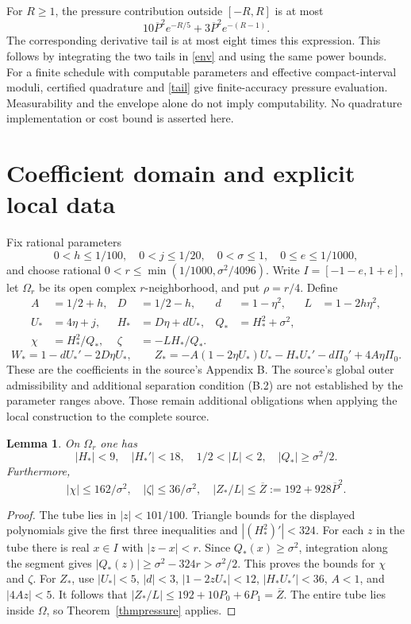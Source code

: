 \documentclass[11pt]{article}
\newtheorem{lemma}[theorem]{Lemma}
\begin{document}
For $R\ge1$, the pressure contribution outside $[-R,R]$ is at most
\begin{equation}\label{tail}
10\overline P^2e^{-R/5}+3\overline P^2e^{-(R-1)}.
\end{equation}
The corresponding derivative tail is at most eight times this expression.
This follows by integrating the two tails in \eqref{env} and using the
same power bounds. For a finite schedule with computable parameters and
effective compact-interval moduli, certified quadrature and \eqref{tail}
give finite-accuracy pressure evaluation. Measurability and the envelope
alone do not imply computability. No quadrature implementation or cost
bound is asserted here.

\section{Coefficient domain and explicit local data}
Fix rational parameters
\[
0<h\le1/100,\quad 0<j\le1/20,\quad 0<\sigma\le1,\quad
0\le e\le1/1000,
\]
and choose rational $0<r\le\min(1/1000,\sigma^2/4096)$.
Write $I=[-1-e,1+e]$, let $\Omega_r$ be its open complex $r$-neighborhood,
and put $\rho=r/4$. Define
\begin{align*}
A&=1/2+h,& D&=1/2-h,& d&=1-\eta^2,& L&=1-2h\eta^2,\\
U_*&=4\eta+j,& H_*&=D\eta+dU_*,& Q_*&=H_*^2+\sigma^2,\\
\chi&=H_*^2/Q_*,& \zeta&=-LH_*/Q_*.
\end{align*}
\[
W_*=1-dU_*'-2D\eta U_*,\qquad
Z_*=-A(1-2\eta U_*)U_*-H_*U_*'-d\Pi_0'+4A\eta\Pi_0.
\]
These are the coefficients in the source's Appendix B. The source's
global outer admissibility and additional separation condition (B.2) are
not established by the parameter ranges above. Those remain additional
obligations when applying the local construction to the complete source.

\begin{lemma}\label{domains}
On $\Omega_r$ one has
\[
|H_*|<9,\quad |H_*'|<18,\quad 1/2<|L|<2,\quad |Q_*|\ge\sigma^2/2.
\]
Furthermore,
\[
|\chi|\le162/\sigma^2,\quad |\zeta|\le36/\sigma^2,\quad
|Z_*/L|\le\overline Z:=192+928\overline P^2.
\]
\end{lemma}
\begin{proof}
The tube lies in $|z|<101/100$. Triangle bounds for the displayed
polynomials give the first three inequalities and
$|(H_*^2)'|<324$. For each $z$ in the tube there is real $x\in I$
with $|z-x|<r$. Since $Q_*(x)\ge\sigma^2$, integration along the
segment gives $|Q_*(z)|\ge\sigma^2-324r>\sigma^2/2$.
This proves the bounds for $\chi$ and $\zeta$.
For $Z_*$, use $|U_*|<5$, $|d|<3$, $|1-2zU_*|<12$,
$|H_*U_*'|<36$, $A<1$, and $|4Az|<5$.
It follows that $|Z_*/L|\le192+10P_0+6P_1=\overline Z$.
The entire tube lies inside $\Omega$, so Theorem~\ref{thmpressure} applies.
\end{proof}
\end{document}
